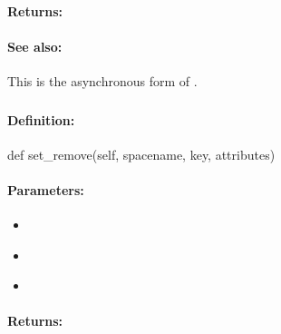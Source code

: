\paragraph{Returns:}


\paragraph{See also:}  This is the asynchronous form of .

\pagebreak
\subsubsection{}
\label{api:python:set_remove}


\paragraph{Definition:}
\begin{pythoncode}
def set_remove(self, spacename, key, attributes)
\end{pythoncode}

\paragraph{Parameters:}
\begin{itemize}[noitemsep]
\item {}\\

\item {}\\

\item {}\\

\end{itemize}

\paragraph{Returns:}


\pagebreak
\subsubsection{}
\label{api:python:async_set_remove}


